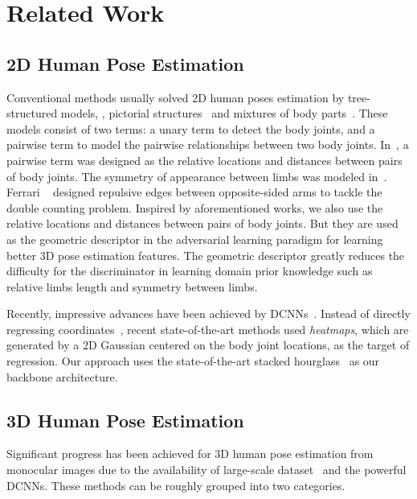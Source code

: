 \documentclass[10pt,twocolumn,letterpaper]{article}
\begin{document}
\section{Related Work} 

\subsection{2D Human Pose Estimation} 
Conventional methods usually solved 2D human poses estimation by tree-structured models, \eg, pictorial structures~\cite{pishchulin2013poselet} and mixtures of body parts~\cite{yang2011articulated,chen2014articulated}. 
These models consist of two terms: a unary term to detect the body joints, and a pairwise term to model the pairwise relationships between two body joints. 
In~\cite{yang2011articulated,chen2014articulated}, a pairwise term was designed as the relative locations and distances between pairs of body joints. 
The symmetry of appearance between limbs was modeled in~\cite{ren2005recovering,tian2010fast}. 
Ferrari \etal~\cite{ferrari20092d} designed repulsive edges between opposite-sided arms to tackle the double counting problem. 
Inspired by aforementioned works, we also use the relative locations and distances between pairs of body joints. 
But they are used as the geometric descriptor in the adversarial learning paradigm for learning better 3D pose estimation features. 
The geometric descriptor greatly reduces the difficulty for the discriminator in learning domain prior knowledge such as relative limbs length and symmetry between limbs.

Recently, impressive advances have been achieved by DCNNs~\cite{toshev2014deeppose,wei2016convolutional,newell2016stacked,chu2016structured,cao2016realtime,yang2016end,chu2017multi,yang2017learning,zhao2018pose}. 
Instead of directly regressing coordinates~\cite{toshev2014deeppose}, recent state-of-the-art methods used \textit{heatmaps}, which are generated by a 2D Gaussian centered on the body joint locations, as the target of regression. 
Our approach uses the state-of-the-art stacked hourglass~\cite{newell2016stacked} as our backbone architecture. 



\subsection{3D Human Pose Estimation} 
Significant progress has been achieved for 3D human pose estimation from monocular images due to the availability of large-scale dataset~\cite{bogo2016keep} and the powerful DCNNs. 
These methods can be roughly grouped into two categories.  
\end{document}
